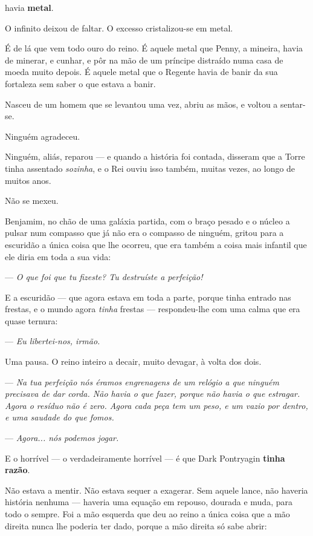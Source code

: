 \documentclass[livro.tex]{subfiles}
\begin{document}
havia \textbf{metal}.

\medskip

O infinito deixou de faltar. O excesso cristalizou-se em metal.

\medskip

É de lá que vem todo ouro do reino. É aquele metal que Penny, a mineira, havia de minerar, e cunhar, e pôr na mão de um
príncipe distraído numa casa de moeda muito depois. É aquele metal que o Regente havia de banir da sua fortaleza
sem saber o que estava a banir.

Nasceu de um homem que se levantou uma vez, abriu as mãos, e voltou a sentar-se.

\medskip

Ninguém agradeceu.

Ninguém, aliás, reparou --- e quando a história foi contada, disseram que a Torre tinha assentado \emph{sozinha}, e
o Rei ouviu isso também, muitas vezes, ao longo de muitos anos.

Não se mexeu.

\medskip

Benjamim, no chão de uma galáxia partida, com o braço pesado e o núcleo a pulsar num compasso que já não era o
compasso de ninguém, gritou para a escuridão a única coisa que lhe ocorreu, que era também a coisa mais infantil
que ele diria em toda a sua vida:

--- \emph{O que foi que tu fizeste? Tu destruíste a perfeição!}

E a escuridão --- que agora estava em toda a parte, porque tinha entrado nas frestas, e o mundo agora \emph{tinha}
frestas --- respondeu-lhe com uma calma que era quase ternura:

--- \emph{Eu libertei-nos, irmão.}

Uma pausa. O reino inteiro a decair, muito devagar, à volta dos dois.

--- \emph{Na tua perfeição nós éramos engrenagens de um relógio a que ninguém precisava de dar corda. Não havia o
que fazer, porque não havia o que estragar. Agora o resíduo não é zero. Agora cada peça tem um peso, e um vazio por
dentro, e uma saudade do que fomos.}

--- \emph{Agora... nós podemos jogar.}

\medskip

E o horrível --- o verdadeiramente horrível --- é que Dark Pontryagin \textbf{tinha razão}.

Não estava a mentir. Não estava sequer a exagerar. Sem aquele lance, não haveria história nenhuma --- haveria uma
equação em repouso, dourada e muda, para todo o sempre. Foi a mão esquerda que deu ao reino a única coisa que a mão
direita nunca lhe poderia ter dado, porque a mão direita só sabe abrir:
\end{document}
